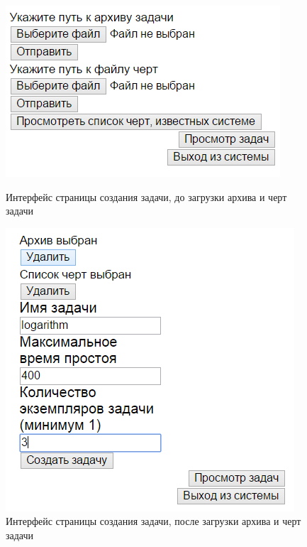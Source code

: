 \documentclass[a4paper,12pt]{report}
\numberwithin{equation}{section}
\begin{document}
  \begin{figure}
    \centering
    \begin{minipage}{.49\linewidth}
      \centering
      \includegraphics[width=\linewidth]{img/interface/create}
      \caption{Интерфейс страницы создания задачи, до загрузки архива и черт задачи}
      \label{fig:interface-create}
    \end{minipage}
    \hfill
    \begin{minipage}{.49\linewidth}
      \centering
      \includegraphics[width=\linewidth]{img/interface/create-final}
      \caption{Интерфейс страницы создания задачи, после загрузки архива и черт задачи}
      \label{fig:interface-create-final}
    \end{minipage}  
  \end{figure}
  
\end{document}
